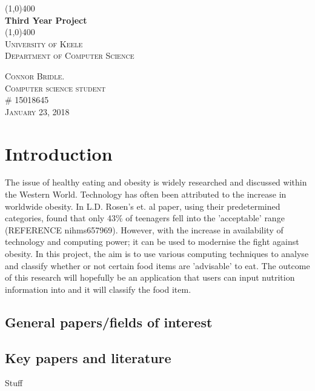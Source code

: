 \documentclass[11pt]{article}
\begin{document}
\begin{titlepage}
	\begin{center}
	\line(1,0){400} \\
	[0.25in]
	\huge{\bfseries Third Year Project} \\
	[2mm]
	\line(1,0){400} \\
	[1.5cm]
	\textsc{\LARGE University of Keele}\\
	\textsc{\Large Department of Computer Science}\\
	[10cm]
	\end{center}
	\begin{flushright}
	\textsc{\large Connor Bridle. \\
	Computer science student\\
	\# 15018645 \\
	January 23, 2018 \\}
	\end{flushright}
\end{titlepage}
\tableofcontents 
\pagebreak
\section{Introduction}
The issue of healthy eating and obesity is widely researched and discussed within the Western World. Technology has often been attributed to the increase in worldwide obesity. In L.D. Rosen's et. al paper, using their predetermined categories, found that only 43\% of teenagers fell into the 'acceptable' range (REFERENCE nihms657969). However, with the increase in availability of technology and computing power; it can be used to modernise the fight against obesity. In this project, the aim is to use various computing techniques to analyse and classify whether or not certain food items are 'advisable' to eat. The outcome of this research will hopefully be an application that users can input nutrition information into and it will classify the food item.
	\subsection{General papers/fields of interest}
	
	\subsection{Key papers and literature}
	Stuff
\end{document}

